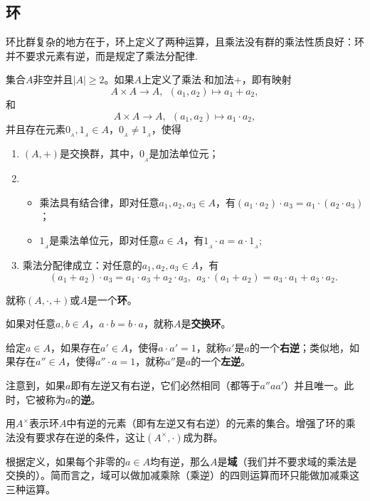 \documentclass[lang=cn,10pt]{elegantbook}
\begin{document}
	\subsection{环}
	环比群复杂的地方在于，环上定义了两种运算，且乘法没有群的乘法性质良好：环并不要求元素有逆，而是规定了乘法分配律.
	\begin{definition}[环]
		集合$A$非空并且$|A|\geqslant 2$。如果$A$上定义了乘法$\cdot$和加法$+$，即有映射
		\[A\times A\rightarrow A,  \ \ (a_1,a_2)\mapsto a_1+ a_2,\]
		和
		\[A\times A\rightarrow A,  \ \ (a_1,a_2)\mapsto a_1\cdot a_2,\]
		并且存在元素$0_{_A}, 1_{_A}\in A$，$0_{_A}\neq 1_{_A}$，使得
		\begin{enumerate}[label=\arabic*)]
			\item  $(A,+)$是交换群，其中，$0_{_A}$是加法单位元；
			\item  \begin{itemize}
				\item 乘法具有结合律，即对任意$a_1,a_2,a_3\in A$，有$(a_1\cdot a_2)\cdot a_3=a_1\cdot (a_2 \cdot a_3)$；
				\item $1_{_A}$是乘法单位元，即对任意$a\in A$，有$1_{_A}\cdot a=a\cdot 1_{_A}$;
			\end{itemize}
			\item  乘法分配律成立：对任意的$a_1,a_2,a_3\in A$，有
			\[(a_1+ a_2)\cdot a_3=a_1\cdot a_3 +a_2\cdot a_3,\ \ a_3\cdot (a_1+ a_2)=a_3\cdot a_1 +a_3\cdot a_2.\]
		\end{enumerate}
		就称$(A,\cdot,+)$或$A$是一个{\bf 环}。
	\end{definition}
	\begin{note}
		如果对任意$a,b\in A$，$a\cdot b=b\cdot a$，就称$A$是{\bf 交换环}。
	\end{note}
	\begin{definition}[逆]
		给定$a\in A$，如果存在$a'\in A$，使得$a\cdot a'=1$，就称$a'$是$a$的一个{\bf 右逆}；类似地，如果存在$a''\in A$，使得$a''\cdot a=1$，就称$a''$是$a$的一个{\bf 左逆}。
		
		注意到，如果$a$即有左逆又有右逆，它们必然相同（都等于$a''aa'$）并且唯一。此时，它被称为$a$的{\bf 逆}。
		
		用$A^\times$表示环$A$中有逆的元素（即有左逆又有右逆）的元素的集合。增强了环的乘法没有要求存在逆的条件，这让$(A^\times,\cdot)$成为群。
	\end{definition}
	\begin{note}
		根据定义，如果每个非零的$a \in A$均有逆，那么$A$是{\bf 域}（我们并不要求域的乘法是交换的）。简而言之，域可以做加减乘除（乘逆）的四则运算而环只能做加减乘这三种运算。
	\end{note}
\end{document}
